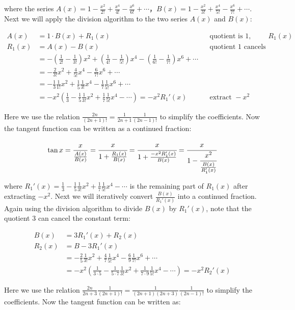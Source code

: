 where the series $A(x) = 1 - \frac{x^2}{2!} + \frac{x^4}{4!} - \frac{x^6}{6!} + \dotsb$，$B(x) = 1 - \frac{x^2}{3!} + \frac{x^4}{5!} - \frac{x^6}{7!} + \dotsb$. Next we will apply the division algorithm to the two series $A(x)$ and $B(x)$:

\begin{align*}
A(x) &= 1 \cdot B(x) + R_1(x) && \text{quotient is 1, remainder is }R_1(x) \\
R_1(x) &= A(x) - B(x) && \text{quotient 1 cancels the constant term} \\
  &= -(\frac{1}{2!} - \frac{1}{3!})x^2 + (\frac{1}{4!} - \frac{1}{5!})x^4 -(\frac{1}{6!} - \frac{1}{7!})x^6 + \dotsb \\
  &= - \frac{2}{3!}x^2 + \frac{4}{5!}x^4 - \frac{6}{7!}x^6 + \dotsb \\
  &= - \frac{1}{3}\frac{1}{1!}x^2 + \frac{1}{5}\frac{1}{3!}x^4 - \frac{1}{7}\frac{1}{5!}x^6 + \dotsb \\
  &= -x^2(\frac{1}{3} - \frac{1}{5}\frac{1}{3!}x^2 + \frac{1}{7}\frac{1}{5!}x^4 - \dotsb) = -x^2 R_1'(x) && \text{extract }-x^2
\end{align*}

Here we use the relation $\frac{2n}{(2n + 1)!} = \frac{1}{2n+1}\frac{1}{(2n-1)!}$ to simplify the coefficients. Now the tangent function can be written as a continued fraction:

\[
\tan x = \frac{x}{\frac{A(x)}{B(x)}} = \cfrac{x}{1 + \frac{R_1(x)}{B(x)}}
 = \cfrac{x}{1 + \frac{-x^2 R_1'(x)}{B(x)}} = \cfrac{x}{1 - \cfrac{x^2}{\frac{B(x)}{R_1'(x)}}}
\]

where $R_1'(x) = \frac{1}{3} - \frac{1}{5}\frac{1}{3!}x^2 + \frac{1}{7}\frac{1}{5!}x^4 - \dotsb$ is the remaining part of $R_1(x)$ after extracting $-x^2$. Next we will iteratively convert $\frac{B(x)}{R_1'(x)}$ into a continued fraction. Again using the division algorithm to divide $B(x)$ by $R_1'(x)$, note that the quotient 3 can cancel the constant term:

\begin{align*}
B(x) &= 3R_1'(x) + R_2(x)  \\
R_2(x) &= B - 3R_1'(x) \\
   &= - \frac{2}{5}\frac{1}{3!}x^2 + \frac{4}{7}\frac{1}{5!}x^4 - \frac{6}{9}\frac{1}{7!}x^6 + \dotsb \\
   &= -x^2(\frac{1}{3 \cdot 5} - \frac{1}{5 \cdot 7}\frac{1}{3!}x^2 + \frac{1}{7 \cdot 9}\frac{1}{5!}x^4 - \dotsb) = -x^2 R_2'(x)
\end{align*}

Here we use the relation $\frac{2n}{2n+3}\frac{1}{(2n+1)!} = \frac{1}{(2n + 1)(2n + 3)}\frac{1}{(2n - 1)!}$ to simplify the coefficients. Now the tangent function can be written as:

